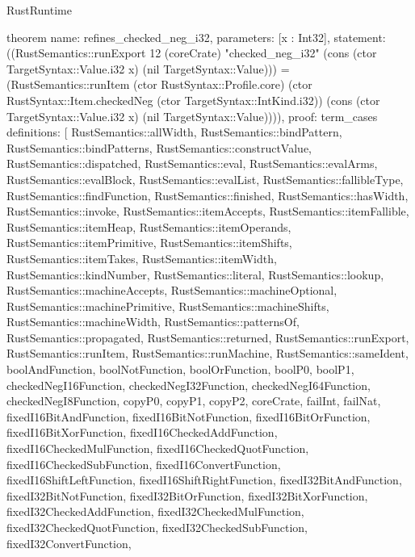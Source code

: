 \begin{lexlean}{RustRuntime}
\begin{semanticmodule}
theorem{
  name: refines_checked_neg_i32,
  parameters: [x : Int32],
  statement: ((RustSemantics::runExport 12 (coreCrate) "checked_neg_i32" (cons (ctor TargetSyntax::Value.i32 x) (nil TargetSyntax::Value))) = (RustSemantics::runItem (ctor RustSyntax::Profile.core) (ctor RustSyntax::Item.checkedNeg (ctor TargetSyntax::IntKind.i32)) (cons (ctor TargetSyntax::Value.i32 x) (nil TargetSyntax::Value)))),
  proof: term_cases{
    definitions: [
      RustSemantics::allWidth,
      RustSemantics::bindPattern,
      RustSemantics::bindPatterns,
      RustSemantics::constructValue,
      RustSemantics::dispatched,
      RustSemantics::eval,
      RustSemantics::evalArms,
      RustSemantics::evalBlock,
      RustSemantics::evalList,
      RustSemantics::fallibleType,
      RustSemantics::findFunction,
      RustSemantics::finished,
      RustSemantics::hasWidth,
      RustSemantics::invoke,
      RustSemantics::itemAccepts,
      RustSemantics::itemFallible,
      RustSemantics::itemHeap,
      RustSemantics::itemOperands,
      RustSemantics::itemPrimitive,
      RustSemantics::itemShifts,
      RustSemantics::itemTakes,
      RustSemantics::itemWidth,
      RustSemantics::kindNumber,
      RustSemantics::literal,
      RustSemantics::lookup,
      RustSemantics::machineAccepts,
      RustSemantics::machineOptional,
      RustSemantics::machinePrimitive,
      RustSemantics::machineShifts,
      RustSemantics::machineWidth,
      RustSemantics::patternsOf,
      RustSemantics::propagated,
      RustSemantics::returned,
      RustSemantics::runExport,
      RustSemantics::runItem,
      RustSemantics::runMachine,
      RustSemantics::sameIdent,
      boolAndFunction,
      boolNotFunction,
      boolOrFunction,
      boolP0,
      boolP1,
      checkedNegI16Function,
      checkedNegI32Function,
      checkedNegI64Function,
      checkedNegI8Function,
      copyP0,
      copyP1,
      copyP2,
      coreCrate,
      failInt,
      failNat,
      fixedI16BitAndFunction,
      fixedI16BitNotFunction,
      fixedI16BitOrFunction,
      fixedI16BitXorFunction,
      fixedI16CheckedAddFunction,
      fixedI16CheckedMulFunction,
      fixedI16CheckedQuotFunction,
      fixedI16CheckedSubFunction,
      fixedI16ConvertFunction,
      fixedI16ShiftLeftFunction,
      fixedI16ShiftRightFunction,
      fixedI32BitAndFunction,
      fixedI32BitNotFunction,
      fixedI32BitOrFunction,
      fixedI32BitXorFunction,
      fixedI32CheckedAddFunction,
      fixedI32CheckedMulFunction,
      fixedI32CheckedQuotFunction,
      fixedI32CheckedSubFunction,
      fixedI32ConvertFunction,
}}
\end{semanticmodule}
\end{lexlean}
